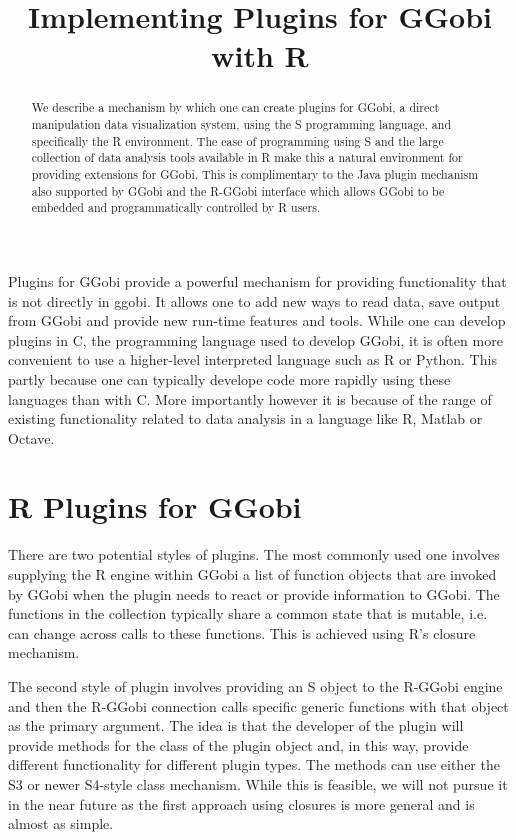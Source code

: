 \documentclass{article}
\title{Implementing Plugins for GGobi with R}
\begin{document}
\maketitle

\begin{abstract}

  We describe a mechanism by which one can create plugins for GGobi, a
  direct manipulation data visualization system, using the S
  programming language, and specifically the R environment.  
  The ease of programming using S and the large collection of 
  data analysis tools available in R make this a natural
  environment for providing extensions for GGobi. This is
  complimentary to the Java plugin mechanism also supported by GGobi
  and the R-GGobi interface which allows GGobi to be embedded and 
  programmatically controlled by R users.

\end{abstract}

Plugins for GGobi provide a powerful mechanism for providing
functionality that is not directly in ggobi.  It allows one to add new
ways to read data, save output from GGobi and provide new run-time
features and tools.  While one can develop plugins in C, the
programming language used to develop GGobi, it is often more
convenient to use a higher-level interpreted language such as R or
Python.  This partly because one can typically develope code more
rapidly using these languages than with C.  More importantly however
it is because of the range of existing functionality related to data
analysis in a language like R, Matlab or Octave.


\section{R Plugins for GGobi}
There are two potential styles of plugins.  The most commonly used one
involves supplying the R engine within GGobi a list of function
objects that are invoked by GGobi when the plugin needs to react or
provide information to GGobi.  The functions in the collection
typically share a common state that is mutable, i.e. can change across
calls to these functions.  This is achieved using R's closure
mechanism.

The second style of plugin involves providing an S object to the
R-GGobi engine and then the R-GGobi connection calls specific generic
functions with that object as the primary argument.  The idea is that
the developer of the plugin will provide methods for the class of the
plugin object and, in this way, provide different functionality for
different plugin types. The methods can use either the S3 or newer
S4-style class mechanism.  While this is feasible, we will not pursue
it in the near future as the first approach using closures is more
general and is almost as simple.
\end{document}

